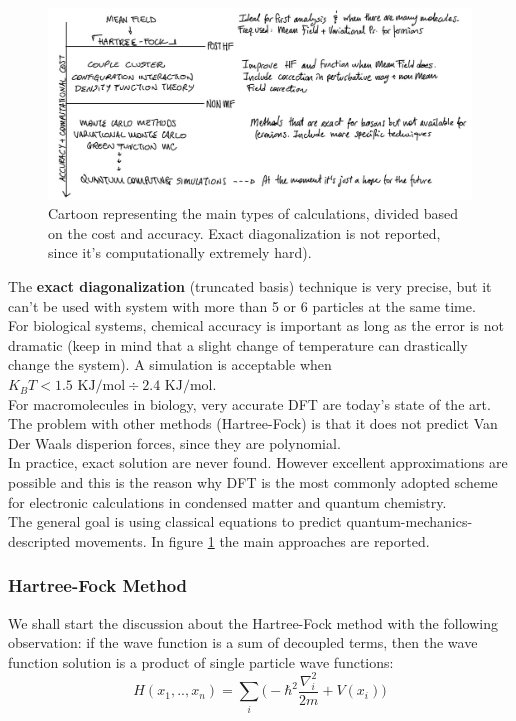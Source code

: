 \begin{figure}[htbp!]
	\centering
	\includegraphics[scale=0.30]{img_13}
	\caption{Cartoon representing the main types of calculations, divided based on the cost and accuracy. Exact diagonalization is not reported, since it's computationally extremely hard). }
\label{fig:calculations}
\end{figure}

\newline
The \textbf{exact diagonalization} (truncated basis) technique is very precise, but it can't be used with system with more than 5 or 6 particles at the same time.\\
For biological systems, chemical accuracy is important as long as the error is not dramatic (keep in mind that a slight change of temperature can drastically change the system). A simulation is acceptable when $K_BT < 1.5\text{ KJ/mol} \div 2.4 \text{ KJ/mol}$.\\
For macromolecules in biology, very accurate DFT are today's state of the art. The problem with other methods (Hartree-Fock) is that it does not predict Van Der Waals disperion forces, since they are polynomial. 
\\
In practice, exact solution are never found. However excellent approximations are possible and this is the reason why DFT is the most commonly adopted scheme for electronic calculations in condensed matter and quantum chemistry.\\

The general goal is using classical equations to predict quantum-mechanics-descripted movements. In figure \ref{fig:calculations} the main approaches are reported.\\

\subsubsection{Hartree-Fock Method}
We shall start the discussion about the Hartree-Fock method with the following observation: if the wave function is a sum of decoupled terms, then the wave function solution is a product of single particle wave functions:
 \[
 H(x_1,.., x_n) = \sum_i \bigg(-\hbar^2 \frac{\nabla_i^2}{2m} + V(x_i) \bigg)
 \]
 
